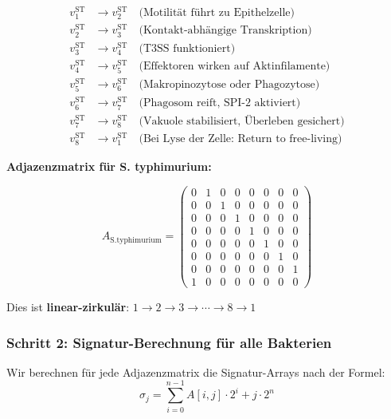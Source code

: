 \documentclass[a4paper,12pt]{article}
\theoremstyle{definition}
\begin{document}
\begin{align*}
v_1^{\text{ST}} &\to v_2^{\text{ST}} \quad \text{(Motilität führt zu Epithelzelle)} \\
v_2^{\text{ST}} &\to v_3^{\text{ST}} \quad \text{(Kontakt-abhängige Transkription)} \\
v_3^{\text{ST}} &\to v_4^{\text{ST}} \quad \text{(T3SS funktioniert)} \\
v_4^{\text{ST}} &\to v_5^{\text{ST}} \quad \text{(Effektoren wirken auf Aktinfilamente)} \\
v_5^{\text{ST}} &\to v_6^{\text{ST}} \quad \text{(Makropinozytose oder Phagozytose)} \\
v_6^{\text{ST}} &\to v_7^{\text{ST}} \quad \text{(Phagosom reift, SPI-2 aktiviert)} \\
v_7^{\text{ST}} &\to v_8^{\text{ST}} \quad \text{(Vakuole stabilisiert, Überleben gesichert)} \\
v_8^{\text{ST}} &\to v_1^{\text{ST}} \quad \text{(Bei Lyse der Zelle: Return to free-living)}
\end{align*}

\textbf{Adjazenzmatrix für S. typhimurium:}

\[
A_{\text{S.typhimurium}} = \begin{pmatrix}
0 & 1 & 0 & 0 & 0 & 0 & 0 & 0 \\
0 & 0 & 1 & 0 & 0 & 0 & 0 & 0 \\
0 & 0 & 0 & 1 & 0 & 0 & 0 & 0 \\
0 & 0 & 0 & 0 & 1 & 0 & 0 & 0 \\
0 & 0 & 0 & 0 & 0 & 1 & 0 & 0 \\
0 & 0 & 0 & 0 & 0 & 0 & 1 & 0 \\
0 & 0 & 0 & 0 & 0 & 0 & 0 & 1 \\
1 & 0 & 0 & 0 & 0 & 0 & 0 & 0
\end{pmatrix}
\]

Dies ist \textbf{linear-zirkulär}: $1 \to 2 \to 3 \to \cdots \to 8 \to 1$

\subsubsection{Schritt 2: Signatur-Berechnung für alle Bakterien}

Wir berechnen für jede Adjazenzmatrix die Signatur-Arrays nach der Formel:
\[
\sigma_j = \sum_{i=0}^{n-1} A[i,j] \cdot 2^i + j \cdot 2^n
\]
\end{document}

